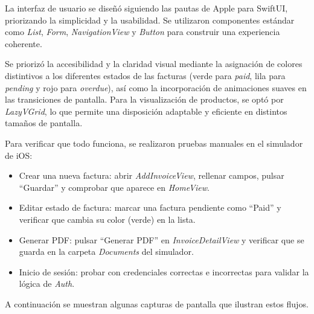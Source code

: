 \begin{large}

La interfaz de usuario se diseñó siguiendo las pautas de Apple para SwiftUI, priorizando la simplicidad y la usabilidad. Se utilizaron componentes estándar como \textit{List}, \textit{Form}, \textit{NavigationView} y \textit{Button} para construir una experiencia coherente.

Se priorizó la accesibilidad y la claridad visual mediante la asignación de colores distintivos a los diferentes estados de las facturas (verde para \textit{paid}, lila para \textit{pending} y rojo para \textit{overdue}), así como la incorporación de animaciones suaves en las transiciones de pantalla. Para la visualización de productos, se optó por \textit{LazyVGrid}, lo que permite una disposición adaptable y eficiente en distintos tamaños de pantalla.

Para verificar que todo funciona, se realizaron pruebas manuales en el simulador de iOS:

\begin{itemize}
  \item Crear una nueva factura: abrir \textit{AddInvoiceView}, rellenar campos, pulsar “Guardar” y comprobar que aparece en \textit{HomeView}.
  \item Editar estado de factura: marcar una factura pendiente como “Paid” y verificar que cambia su color (verde) en la lista.
  \item Generar PDF: pulsar “Generar PDF” en \textit{InvoiceDetailView} y verificar que se guarda en la carpeta \emph{Documents} del simulador.
  \item Inicio de sesión: probar con credenciales correctas e incorrectas para validar la lógica de \textit{Auth}.
\end{itemize}

A continuación se muestran algunas capturas de pantalla que ilustran estos flujos.


\end{large}
